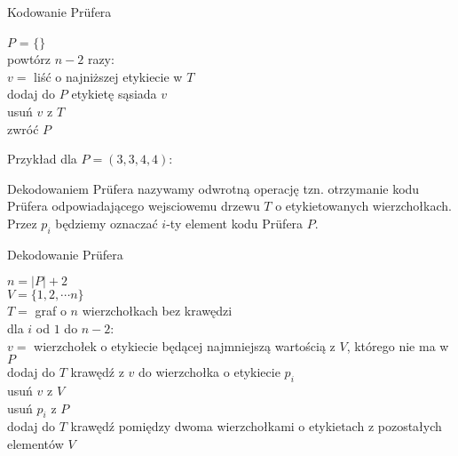 \documentclass[a4paper,12p]{article}
\newcommand\tab[1][1cm]{\hspace*{#1}}
\begin{document}
\begin{algorithm}
		\caption{Kodowanie Prüfera}
		\label{algo}
		$P$ = $\{ \}$ \\
		powtórz $n-2$ razy: \\
			\tab $v =$ liść o najniższej etykiecie w $T$ \\
			\tab dodaj do $P$ etykietę sąsiada $v$ \\
			\tab usuń $v$ z $T$ \\
		zwróć $P$
\end{algorithm}

Przykład dla $P = ( 3, 3, 4, 4 )$:


Dekodowaniem Prüfera nazywamy odwrotną operację tzn. otrzymanie kodu Prüfera odpowiadającego wejsciowemu drzewu $T$ o etykietowanych wierzchołkach. Przez $p_i$ będziemy oznaczać $i$-ty element kodu Prüfera $P$.

\begin{algorithm}
		\caption{Dekodowanie Prüfera}
		\label{algo}
		
		$n = |P| + 2$ \\
		$V = \{ 1, 2, \cdots n \}$ \\
		$T = $ graf o $n$ wierzchołkach bez krawędzi \\
		dla $i$ od $1$ do $n-2$: \\
			\tab $v =$ wierzchołek o etykiecie będącej najmniejszą wartością z $V$, którego nie ma w $P$ \\
			\tab dodaj do $T$ krawędź z $v$ do wierzchołka o etykiecie $p_i$ \\
			\tab usuń $v$ z $V$ \\
			\tab usuń $p_i$ z $P$ \\
		dodaj do $T$ krawędź pomiędzy dwoma wierzchołkami o etykietach z pozostałych elementów $V$ 
\end{algorithm}
\end{document}
